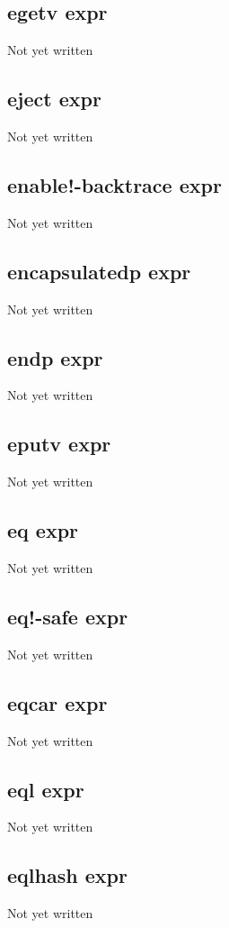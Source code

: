 \documentclass[a4paper,11pt]{article}
\begin{document}
\subsection{\ttfamily egetv expr}
Not yet written

\subsection{\ttfamily eject expr}
Not yet written

\subsection{\ttfamily enable!-backtrace expr}
Not yet written

\subsection{\ttfamily encapsulatedp expr}
Not yet written

\subsection{\ttfamily endp expr}
Not yet written

\subsection{\ttfamily eputv expr}
Not yet written

\subsection{\ttfamily eq expr}
Not yet written

\subsection{\ttfamily eq!-safe expr}
Not yet written

\subsection{\ttfamily eqcar expr}
Not yet written

\subsection{\ttfamily eql expr}
Not yet written

\subsection{\ttfamily eqlhash expr}
Not yet written
\end{document}
